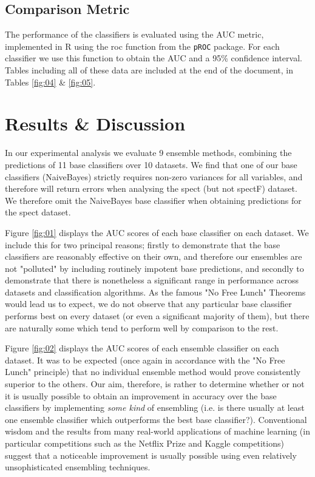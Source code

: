 \documentclass{bioinfo}
\begin{document}
\begin{methods}
\subsection{Comparison Metric}

The performance of the classifiers is evaluated using the AUC metric, implemented in R using the roc function from the \texttt{pROC} package. For each classifier we use this function to obtain the AUC and a 95\% confidence interval. Tables including all of these data are included at the end of the document, in Tables \ref{fig:04} \& \ref{fig:05}.

\end{methods}



\section{Results \& Discussion}
\label{results&discussion}

In our experimental analysis we evaluate 9 ensemble methods, combining the predictions of 11 base classifiers over 10 datasets. We find that one of our base classifiers (NaiveBayes) strictly requires non-zero variances for all variables, and therefore will return errors when analysing the spect (but not spectF) dataset. We therefore omit the NaiveBayes base classifier when obtaining predictions for the spect dataset.

\noindent
Figure \ref{fig:01} displays the  AUC scores of each base classifier on each dataset. We include this for two principal reasons; firstly to demonstrate that the base classifiers are reasonably effective on their own, and therefore our ensembles are not "polluted" by including routinely impotent base predictions, and secondly to demonstrate that there is nonetheless a significant range in performance across datasets and classification algorithms. As the famous "No Free Lunch" Theorems would lead us to expect, we do not observe that any particular base classifier performs best on every dataset (or even a significant majority of them), but there are naturally some which tend to perform well by comparison to the rest.

\noindent
Figure \ref{fig:02} displays the  AUC scores of each ensemble classifier on each dataset. It was to be expected (once again in accordance with the "No Free Lunch" principle) that no individual ensemble method would prove consistently superior to the others. Our aim, therefore, is rather to determine whether or not it is usually possible to obtain an improvement in accuracy over the base classifiers by implementing \emph{some kind} of ensembling (i.e. is there usually at least one ensemble classifier which outperforms the best base classifier?). Conventional wisdom and the results from many real-world applications of machine learning (in particular competitions such as the Netflix Prize\cite{netflixprize} and Kaggle competitions\cite{kagglecompetitions}) suggest that a noticeable improvement is usually possible using even relatively unsophisticated ensembling techniques.
\end{document}
